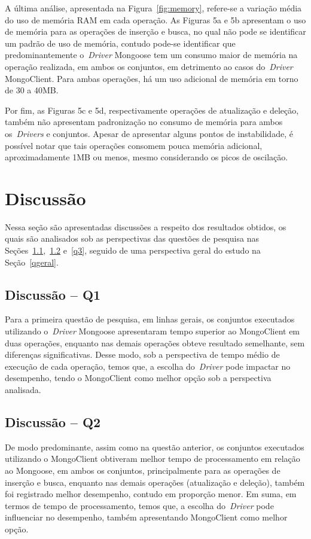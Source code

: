 \documentclass[12pt]{article}
\begin{document}
A última análise, apresentada na Figura~\ref{fig:memory}, refere-se a variação média do uso de memória RAM em cada operação.
As Figuras 5a e 5b apresentam o uso de memória para as operações de inserção e busca, no qual não pode se identificar um padrão de uso de memória, contudo pode-se identificar que predominantemente o~\emph{Driver} Mongoose tem um consumo maior de memória na operação realizada, em ambos os conjuntos, em detrimento ao casos do~\emph{Driver} MongoClient.
Para ambas operações, há um uso adicional de memória em torno de 30 a 40MB.

Por fim, as Figuras 5c e 5d, respectivamente operações de atualização e deleção, também não apresentam padronização no consumo de memória para ambos os~\emph{Drivers} e conjuntos. 
Apesar de apresentar alguns pontos de instabilidade, é possível notar que tais operações consomem pouca memória adicional, aproximadamente 1MB ou menos, mesmo considerando os picos de oscilação.

\section{Discussão}
\label{section:discussao}

Nessa seção são apresentadas discussões a respeito dos resultados obtidos, os quais são analisados sob as perspectivas das questões de pesquisa nas Seções~\ref{q1},~\ref{q2} e~\ref{q3}, seguido de uma perspectiva geral do estudo na Seção~\ref{qgeral}.

\subsection{Discussão -- Q1}
\label{q1}

Para a primeira questão de pesquisa, em linhas gerais, os conjuntos executados utilizando o~\emph{Driver} Mongoose apresentaram tempo superior ao MongoClient em duas operações, enquanto nas demais operações obteve resultado semelhante, sem diferenças significativas.
Desse modo, sob a perspectiva de tempo médio de execução de cada operação, temos que, a escolha do~\emph{Driver} pode impactar no desempenho, tendo o MongoClient como melhor opção sob a perspectiva analisada.

\subsection{Discussão -- Q2}
\label{q2}

De modo predominante, assim como na questão anterior, os conjuntos executados utilizando o MongoClient obtiveram melhor tempo de processamento em relação ao Mongoose, em ambos os conjuntos, principalmente para as operações de inserção e busca, enquanto nas demais operações (atualização e deleção), também foi registrado melhor desempenho, contudo em proporção menor.
Em suma, em termos de tempo de processamento, temos que, a escolha do~\emph{Driver} pode influenciar no desempenho, também apresentando MongoClient como melhor opção.
\end{document}
